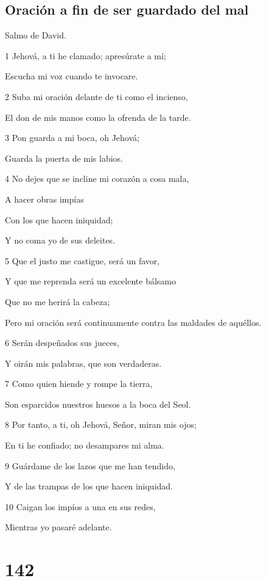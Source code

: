 \section*{Oración a fin de ser guardado del mal}

\par Salmo de David.

\par 1 Jehová, a ti he clamado; apresúrate a mí;
\par Escucha mi voz cuando te invocare.
\par 2 Suba mi oración delante de ti como el incienso,
\par El don de mis manos como la ofrenda de la tarde.
\par 3 Pon guarda a mi boca, oh Jehová;
\par Guarda la puerta de mis labios.
\par 4 No dejes que se incline mi corazón a cosa mala,
\par A hacer obras impías
\par Con los que hacen iniquidad;
\par Y no coma yo de sus deleites.
\par 5 Que el justo me castigue, será un favor,
\par Y que me reprenda será un excelente bálsamo
\par Que no me herirá la cabeza;
\par Pero mi oración será continuamente contra las maldades de aquéllos.
\par 6 Serán despeñados sus jueces,
\par Y oirán mis palabras, que son verdaderas.
\par 7 Como quien hiende y rompe la tierra,
\par Son esparcidos nuestros huesos a la boca del Seol.
\par 8 Por tanto, a ti, oh Jehová, Señor, miran mis ojos;
\par En ti he confiado; no desampares mi alma.
\par 9 Guárdame de los lazos que me han tendido,
\par Y de las trampas de los que hacen iniquidad.
\par 10 Caigan los impíos a una en sus redes,
\par Mientras yo pasaré adelante.

\chapter{142}

